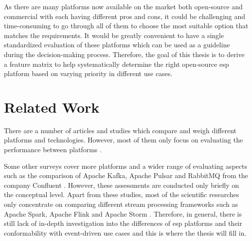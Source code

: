 As there are many platforms now available on the market both open-source and commercial with each having different pros and cons, it could be challenging and time-consuming to go through all of them to choose the most suitable option that matches the requirements. It would be greatly convenient to have a single standardized evaluation of these platforms which can be used as a guideline during the decision-making process. Therefore, the goal of this thesis is to derive a feature matrix to help systematically determine the right open-source \acrshort{esp} platform based on varying priority in different use cases. 


\section{Related Work}

There are a number of articles and studies which compare and weigh different platforms and technologies. However, most of them only focus on evaluating the performance between platforms \cite{benchmarkkafkapulsarrabbitmq} \cite{benchmarkfull} \cite{benchmarkkafkapulsar}.

Some other surveys cover more platforms and a wider range of evaluating aspects such as the comparison of Apache Kafka, Apache Pulsar and RabbitMQ from the company Confluent \cite{overallcomparekafka}. However, these assessments are conducted only briefly on the conceptual level. Apart from these studies, most of the scientific researches only concentrate on comparing different stream processing frameworks such as Apache Spark, Apache Flink and Apache Storm \cite{karimov2018benchmarking} \cite{isah2019survey}. Therefore, in general, there is still lack of in-depth investigation into the differences of \acrshort{esp} platforms and their conformability with event-driven use cases and this is where the thesis will fill in.
 
